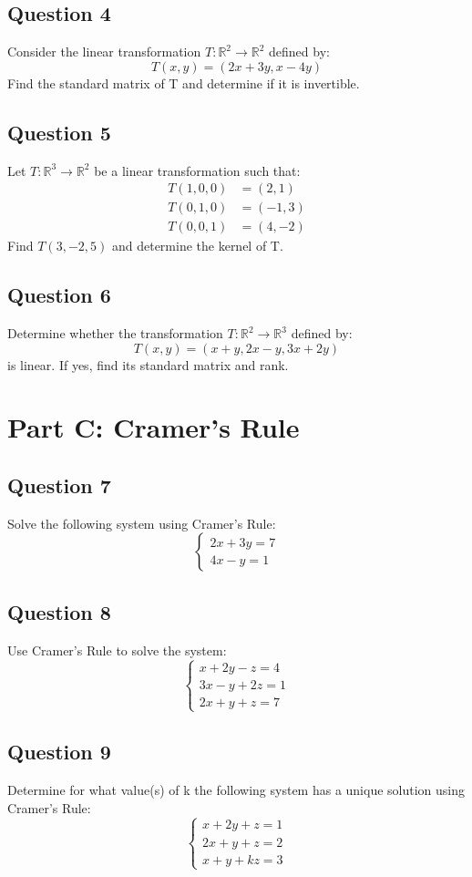 \documentclass[12pt]{article}
\begin{document}
\subsection*{Question 4}
Consider the linear transformation $T : \mathbb{R}^{2} \rightarrow \mathbb{R}^{2}$ defined by:
$$
T(x,y) = (2x + 3y, x - 4y)
$$
Find the standard matrix of T and determine if it is invertible.



\subsection*{Question 5}
Let $T : \mathbb{R}^{3} \rightarrow \mathbb{R}^{2}$ be a linear transformation such that:
\begin{align*}
T(1,0,0) &= (2,1) \\
T(0,1,0) &= (-1,3) \\
T(0,0,1) &= (4,-2)
\end{align*}
Find $T(3,-2,5)$ and determine the kernel of T.



\subsection*{Question 6}
Determine whether the transformation $T : \mathbb{R}^{2} \rightarrow \mathbb{R}^{3}$ defined by:
$$
T(x,y) = (x+y, 2x-y, 3x+2y)
$$
is linear. If yes, find its standard matrix and rank.



\vspace{2em}
\section*{Part C: Cramer's Rule}
\hrulefill
\vspace{1em}

\subsection*{Question 7}
Solve the following system using Cramer's Rule:
$$
\begin{cases}
2x + 3y = 7 \\
4x - y = 1
\end{cases}
$$



\subsection*{Question 8}
Use Cramer's Rule to solve the system:
$$
\begin{cases}
x + 2y - z = 4 \\
3x - y + 2z = 1 \\
2x + y + z = 7
\end{cases}
$$



\subsection*{Question 9}
Determine for what value(s) of k the following system has a unique solution using Cramer's Rule:
$$
\begin{cases}
x + 2y + z = 1 \\
2x + y + z = 2 \\
x + y + kz = 3
\end{cases}
$$


\end{document}
